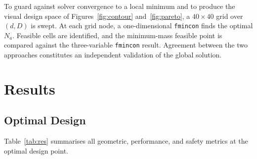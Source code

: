 \documentclass[10pt,twocolumn]{article}
\begin{document}
To guard against solver convergence to a local minimum and to produce the
visual design space of Figures~\ref{fig:contour} and~\ref{fig:pareto},
a $40 \times 40$ grid over $(d, D)$ is swept.
At each grid node, a one-dimensional \texttt{fmincon} finds the optimal $N_a$.
Feasible cells are identified, and the minimum-mass feasible point is compared
against the three-variable \texttt{fmincon} result.
Agreement between the two approaches constitutes an independent validation
of the global solution.

\section{Results}

\subsection{Optimal Design}

Table~\ref{tab:res} summarises all geometric, performance, and safety metrics
at the optimal design point.
\end{document}
